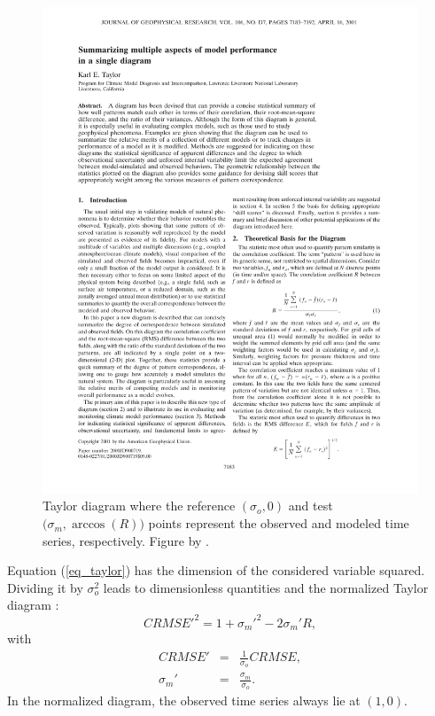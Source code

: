 \documentclass{article}
\begin{document}
\begin{figure}
  \centering
  \includegraphics[page = 2, width = \textwidth, trim = 13em 10em 11em 51em, clip = true]{figures/Taylor2001.pdf}
  \caption{Taylor diagram where the reference $(\sigma_o, 0)$ and test $\big(\sigma_m, \arccos(R)\big)$ points represent the observed and modeled time series, respectively. Figure by \citet{Taylor2001}.}
  \label{fig_taylor}
\end{figure}

Equation (\ref{eq_taylor}) has the dimension of the considered variable squared. Dividing it by $\sigma_o^2$ leads to dimensionless quantities and the normalized Taylor diagram \citep{Karna2016}:
\begin{equation}
  CRMSE'^2 = 1 + \sigma_m'^2 - 2 \sigma_m' R,
\end{equation}
with
\begin{eqnarray}
  CRMSE' & = & \frac{1}{\sigma_o} CRMSE , \\
  \sigma_m' & = & \frac{\sigma_m}{\sigma_o} .
\end{eqnarray}
In the normalized diagram, the observed time series always lie at $(1, 0)$. 
\end{document}
